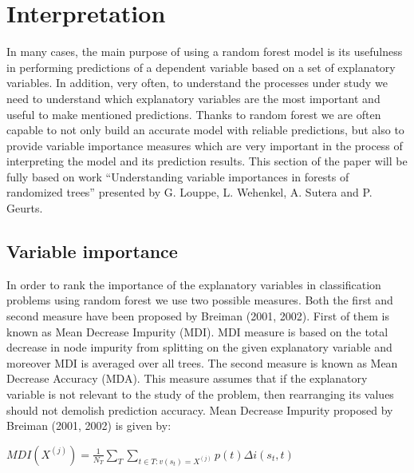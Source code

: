 \section{Interpretation}
In many cases, the main purpose of using a random forest model is its usefulness in performing predictions of a dependent variable based on a set of explanatory variables. In addition, very often, to understand the processes under study we need to understand which explanatory variables are the most important and useful to make mentioned predictions. Thanks to random forest we are often capable to not only build an accurate model with reliable predictions, but also to provide variable importance measures which are very important in the process of interpreting the model and its prediction results. This section of the paper will be fully based on work “Understanding variable importances in forests of randomized trees” presented by G. Louppe, L. Wehenkel, A. Sutera and P. Geurts.

\subsection{Variable importance}
In order to rank the importance of the explanatory variables in classification problems using random forest we use two possible measures. Both the first and second measure have been proposed by Breiman (2001, 2002). First of them is known as Mean Decrease Impurity (MDI). MDI measure is based on the total decrease in node impurity from splitting on the given explanatory variable and moreover MDI is averaged over all trees. The second measure is known as Mean Decrease Accuracy (MDA). This measure assumes that if the explanatory variable is not relevant to the study of the problem, then rearranging its values should not demolish prediction accuracy. Mean Decrease Impurity proposed by Breiman (2001, 2002) is given by: 
\begin{center}
$ MDI( X^{(j)} ) = \frac{1}{N_{T}}\displaystyle\sum_{T}  \displaystyle\sum_{t \in T: v(s_{t}) =  X^{(j)}  } p(t)\Delta i(s_{t}, t)$
\end{center}

